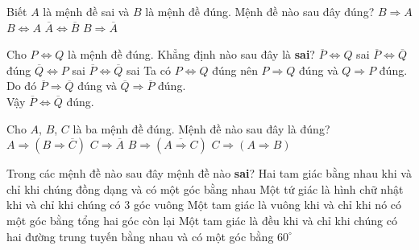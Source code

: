 \begin{ex}%
	Biết $A$ là mệnh đề sai và $B$ là mệnh đề đúng. Mệnh đề nào sau đây đúng?
	\choice
	{$B\Rightarrow A$}
	{$B\Leftrightarrow A$}
	{$\overline{A}\Leftrightarrow \overline{B}$}
	{\True $B\Rightarrow \overline{A}$}
\end{ex}
\begin{ex}%
	Cho $P\Leftrightarrow Q$ là mệnh đề đúng. Khẳng định nào sau đây là \textbf{sai}?
	\choice
	{$\overline{P}\Leftrightarrow Q$ sai}
	{$\overline{P}\Leftrightarrow\overline{Q}$ đúng}
	{$\overline{Q}\Leftrightarrow P$ sai}
	{\True $\overline{P}\Leftrightarrow \overline{Q}$ sai}
	\loigiai
	{
		Ta có $P\Leftrightarrow Q$ đúng nên $P\Rightarrow Q$ đúng và $Q\Rightarrow P$ đúng.\\
		Do đó $\overline P\Rightarrow\overline Q $ đúng và $\overline Q\Rightarrow\overline P $ đúng.\\
		Vậy $\overline P\Leftrightarrow\overline Q $ đúng.
	}
\end{ex}
\begin{ex}%
	Cho $A$, $B$, $C$ là ba mệnh đề đúng. Mệnh đề nào sau đây là đúng?
	\choice
	{$A\Rightarrow (B\Rightarrow \overline{C})$}
	{$C\Rightarrow \overline{A}$}
	{$B\Rightarrow (\overline{A\Rightarrow C})$}
	{\True $C\Rightarrow (A\Rightarrow B)$}
\end{ex}
\begin{ex}%
	Trong các mệnh đề nào sau đây mệnh đề nào \textbf{sai}?
	\choice
	{Hai tam giác bằng nhau khi và chỉ khi chúng đồng dạng và có một góc bằng nhau}
	{Một tứ giác là hình chữ nhật khi và chỉ khi chúng có $3$ góc vuông}
	{\True Một tam giác là vuông khi và chỉ khi nó có một góc bằng tổng hai góc còn lại}
	{Một tam giác là đều khi và chỉ khi chúng có hai đường trung tuyến bằng nhau và có một góc bằng $60^{\circ}$}
\end{ex}
